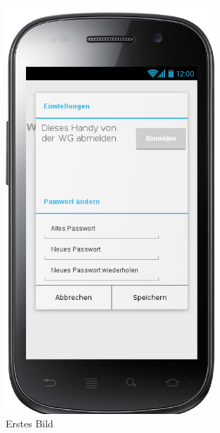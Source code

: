 \begin{figure}[htbp] 
  \centering
     \includegraphics[width=0.7\textwidth]{anhang/mockups/overviewsettings.png}
  \caption{Erstes Bild}
  \label{fig:Bild1}
\end{figure}

